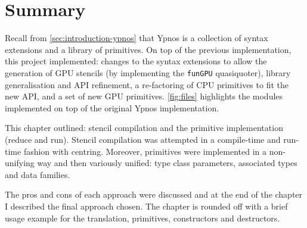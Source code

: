 \documentclass[
    12pt,
    a4paper,
    twoside,
    openright,
    BCOR=7mm,
    ]{scrbook}
\begin{document}
\section{Summary}

Recall from \autoref{sec:introduction-ypnos} that Ypnos is a collection of
syntax extensions and a library of primitives. On top of the previous
implementation, this project implemented: changes to the syntax extensions to
allow the generation of GPU stencils (by implementing the \texttt{funGPU}
quasiquoter), library generalisation and API refinement, a re-factoring of CPU
primitives to fit the new API, and a set of new GPU primitives.
\autoref{fig:files} highlights the modules implemented on top of the original
Ypnos implementation.

This chapter outlined: stencil compilation and the primitive implementation
(reduce and run). Stencil compilation was attempted in a compile-time and
run-time fashion with centring. Moreover, primitives were implemented in a
non-unifying way and then variously unified: type class parameters, associated
types and data families.

The pros and cons of each approach were discussed and at the end of the chapter
I described the final approach chosen. The chapter is rounded off with a brief
usage example for the translation, primitives, constructors and
destructors.
\end{document}
